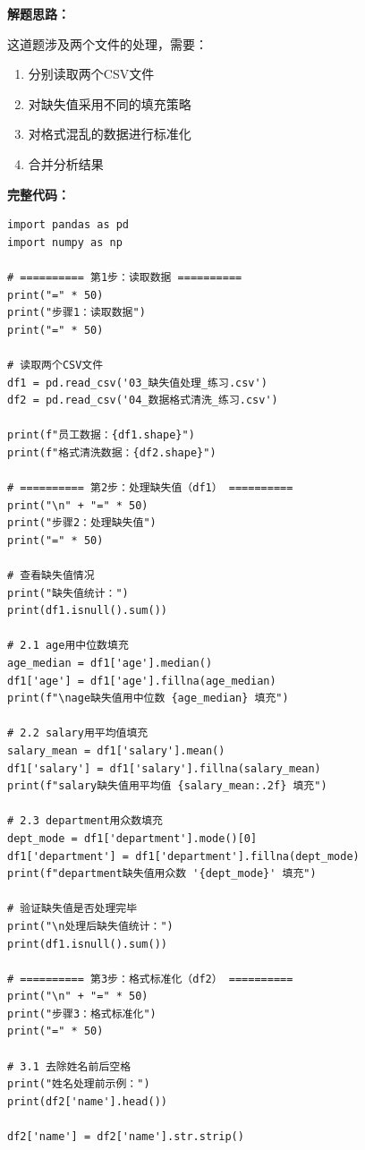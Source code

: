\documentclass[12pt,a4paper]{article}
\begin{document}
\begin{practicebox}

\textbf{解题思路：}

这道题涉及两个文件的处理，需要：
\begin{enumerate}
    \item 分别读取两个CSV文件
    \item 对缺失值采用不同的填充策略
    \item 对格式混乱的数据进行标准化
    \item 合并分析结果
\end{enumerate}

\textbf{完整代码：}

\begin{lstlisting}[caption={员工信息数据处理完整解答}]
import pandas as pd
import numpy as np

# ========== 第1步：读取数据 ==========
print("=" * 50)
print("步骤1：读取数据")
print("=" * 50)

# 读取两个CSV文件
df1 = pd.read_csv('03_缺失值处理_练习.csv')
df2 = pd.read_csv('04_数据格式清洗_练习.csv')

print(f"员工数据：{df1.shape}")
print(f"格式清洗数据：{df2.shape}")

# ========== 第2步：处理缺失值（df1） ==========
print("\n" + "=" * 50)
print("步骤2：处理缺失值")
print("=" * 50)

# 查看缺失值情况
print("缺失值统计：")
print(df1.isnull().sum())

# 2.1 age用中位数填充
age_median = df1['age'].median()
df1['age'] = df1['age'].fillna(age_median)
print(f"\nage缺失值用中位数 {age_median} 填充")

# 2.2 salary用平均值填充
salary_mean = df1['salary'].mean()
df1['salary'] = df1['salary'].fillna(salary_mean)
print(f"salary缺失值用平均值 {salary_mean:.2f} 填充")

# 2.3 department用众数填充
dept_mode = df1['department'].mode()[0]
df1['department'] = df1['department'].fillna(dept_mode)
print(f"department缺失值用众数 '{dept_mode}' 填充")

# 验证缺失值是否处理完毕
print("\n处理后缺失值统计：")
print(df1.isnull().sum())

# ========== 第3步：格式标准化（df2） ==========
print("\n" + "=" * 50)
print("步骤3：格式标准化")
print("=" * 50)

# 3.1 去除姓名前后空格
print("姓名处理前示例：")
print(df2['name'].head())

df2['name'] = df2['name'].str.strip()


\end{lstlisting}
\end{practicebox}
\end{document}
